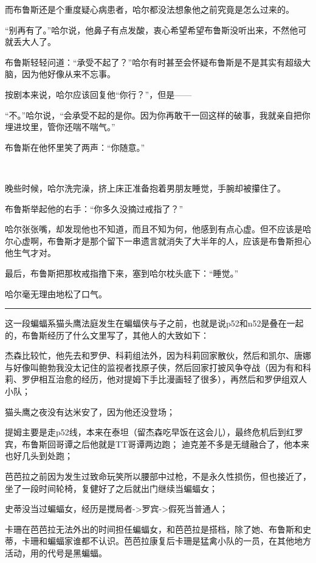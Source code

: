 \documentclass[../main]{subfiles}
\begin{document}
而布鲁斯还是个重度疑心病患者，哈尔都没法想象他之前究竟是怎么过来的。

“别再有了。”哈尔说，他鼻子有点发酸，衷心希望希望布鲁斯没听出来，不然他可就丢大人了。

布鲁斯轻轻问道：“承受不起了？”哈尔有时甚至会怀疑布鲁斯是不是其实有超级大脑，因为他好像从来不忘事。

按剧本来说，哈尔应该回复他“你行？”，但是——

“不。”哈尔说，“会承受不起的是你。因为你再敢干一回这样的破事，我就亲自把你埋进坟里，管你还喘不喘气。”

布鲁斯在他怀里笑了两声：“你随意。”

~\

晚些时候，哈尔洗完澡，挤上床正准备抱着男朋友睡觉，手腕却被攥住了。

布鲁斯举起他的右手：“你多久没摘过戒指了？”

哈尔张张嘴，却发现他也不知道，而且不知为何，他感到有点心虚。但不应该是哈尔心虚啊，布鲁斯才是那个留下一串遗言就消失了大半年的人，应该是布鲁斯担心他生气才对。

最后，布鲁斯把那枚戒指撸下来，塞到哈尔枕头底下：“睡觉。”

哈尔毫无理由地松了口气。

\begin{center}\rule{0.5\linewidth}{0.5pt}\end{center}

这一段蝙蝠系猫头鹰法庭发生在蝙蝠侠与子之前，也就是说p52和n52是叠在一起的，布鲁斯经历了什么文里写了，其他人的大致如下：

杰森比较忙，他先去和罗伊、科莉组法外，因为科莉回家散伙，然后和凯尔、唐娜与好像叫鲍勃我没太记住的监视者找原子侠，然后回家打披风争夺战（因为有和科莉、罗伊相互治愈的经历，他对提姆下手比漫画轻了很多），再然后和罗伊组双人小队；

猫头鹰之夜没有达米安了，因为他还没登场；

提姆主要是走p52线，本来在泰坦（留杰森吃早饭在这会儿），最终危机后到红罗宾，布鲁斯回哥谭之后他就是TT哥谭两边跑；
迪克差不多是无缝融合了，他本来也好几头到处跑；

芭芭拉之前因为发生过致命玩笑所以腰部中过枪，不是永久性损伤，但也接近了，坐了一段时间轮椅，复健好了之后就出门继续当蝙蝠女；

史蒂没当过蝙蝠女，经历是搅局者->罗宾->假死当普通人；

卡珊在芭芭拉无法外出的时间担任蝙蝠女，和芭芭拉是搭档，除了她、布鲁斯和史蒂，卡珊和蝙蝠家谁都不认识。芭芭拉康复后卡珊是猛禽小队的一员，在其他地方活动，用的代号是黑蝙蝠。
\end{document}

